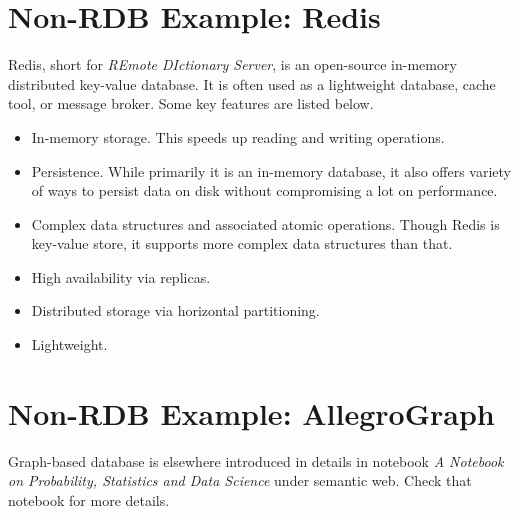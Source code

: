 \section{Non-RDB Example: Redis}

Redis, short for \textit{REmote DIctionary Server}, is an open-source in-memory distributed key-value database. It is often used as a lightweight database, cache tool, or message broker. Some key features are listed below.

\begin{itemize}
\item In-memory storage. This speeds up reading and writing operations.
\item Persistence. While primarily it is an in-memory database, it also offers variety of ways to persist data on disk without compromising a lot on performance.
\item Complex data structures and associated atomic operations. Though Redis is key-value store, it supports more complex data structures than that.
\item High availability via replicas.
\item Distributed storage via horizontal partitioning.
\item Lightweight.
\end{itemize}

\section{Non-RDB Example: AllegroGraph}

Graph-based database is elsewhere introduced in details in notebook \textit{A Notebook on Probability, Statistics and Data Science} under semantic web. Check that notebook for more details. 